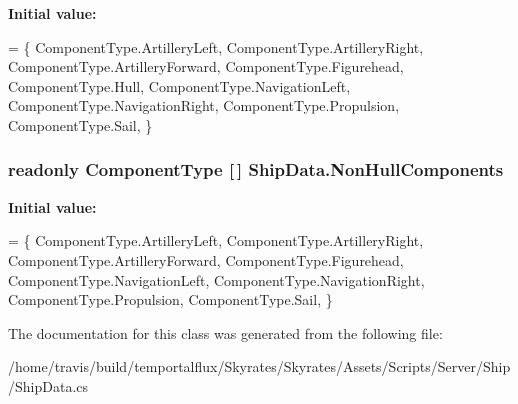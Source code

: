 {\bfseries Initial value\-:}
\begin{DoxyCode}
=
    \{
        ComponentType.ArtilleryLeft,
        ComponentType.ArtilleryRight,
        ComponentType.ArtilleryForward,
        ComponentType.Figurehead,
        ComponentType.Hull,
        ComponentType.NavigationLeft,
        ComponentType.NavigationRight,
        ComponentType.Propulsion,
        ComponentType.Sail,
    \}
\end{DoxyCode}
\hypertarget{class_ship_data_a5ef95366640e8dc06cb884368a8e41a2}{
\subsubsection[{Non\-Hull\-Components}]{\setlength{\rightskip}{0pt plus 5cm}readonly Component\-Type \mbox{[}$\,$\mbox{]} Ship\-Data.\-Non\-Hull\-Components\hspace{0.3cm}{\ttfamily [static]}}}\label{class_ship_data_a5ef95366640e8dc06cb884368a8e41a2}
{\bfseries Initial value\-:}
\begin{DoxyCode}
= \{
        ComponentType.ArtilleryLeft,
        ComponentType.ArtilleryRight,
        ComponentType.ArtilleryForward,
        ComponentType.Figurehead,
        ComponentType.NavigationLeft,
        ComponentType.NavigationRight,
        ComponentType.Propulsion,
        ComponentType.Sail,
    \}
\end{DoxyCode}


The documentation for this class was generated from the following file\-:\begin{DoxyCompactItemize}
\item 
/home/travis/build/temportalflux/\-Skyrates/\-Skyrates/\-Assets/\-Scripts/\-Server/\-Ship/Ship\-Data.\-cs\end{DoxyCompactItemize}
